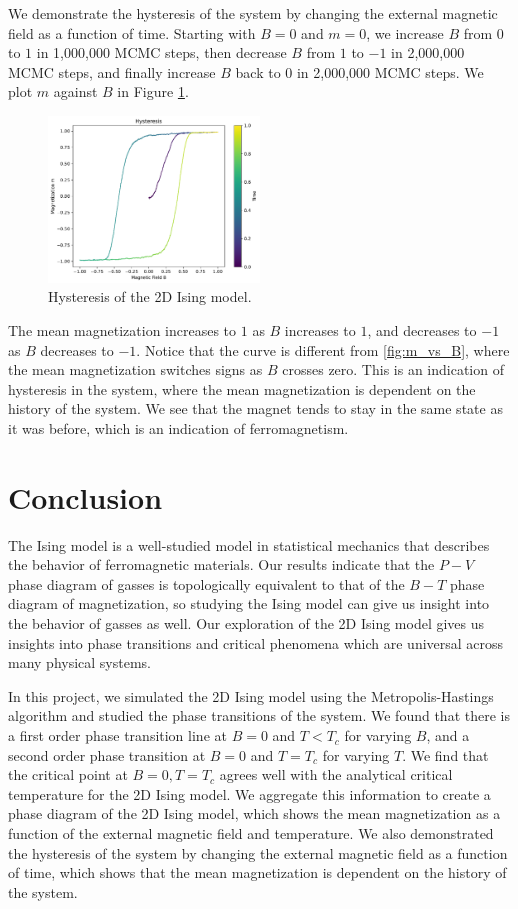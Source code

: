 \documentclass[
 reprint,
 amsmath,
 amssymb,
 aps,
]{revtex4-2}
\begin{document}
We demonstrate the hysteresis of the system by changing the external magnetic
field as a function of time.
Starting with $ B = 0 $ and $ m = 0 $,
we increase $ B $ from $ 0 $ to $ 1 $ in 1,000,000 MCMC steps,
then decrease $ B $ from $ 1 $ to $ -1 $ in 2,000,000 MCMC steps,
and finally increase $ B $ back to $ 0 $ in 2,000,000 MCMC steps.
We plot $ m $ against $ B $ in Figure \ref{fig:hysteresis}.
\begin{figure}[ht]
\centering
\includegraphics[width=0.5\textwidth]{figures/hysteresis.pdf}
\caption{Hysteresis of the 2D Ising model.}
\label{fig:hysteresis}
\end{figure}
The mean magnetization increases to $ 1 $ as $ B $ increases to $ 1 $,
and decreases to $ -1 $ as $ B $ decreases to $ -1 $.
Notice that the curve is different from \ref{fig:m_vs_B},
where the mean magnetization switches signs as $ B $ crosses zero.
This is an indication of hysteresis in the system,
where the mean magnetization is dependent on the history of the system.
We see that the magnet tends to stay in the same state as it was before,
which is an indication of ferromagnetism.



\section{Conclusion}
\label{sec:conclusion}
The Ising model is a well-studied model in statistical mechanics
that describes the behavior of ferromagnetic materials.
Our results indicate that the $ P-V $ phase diagram of gasses is topologically
equivalent to that of the $ B-T $ phase diagram of magnetization,
so studying the Ising model can give us insight into the behavior of gasses
as well.
Our exploration of the 2D Ising model gives us insights into phase
transitions and critical phenomena which are universal across many
physical systems.

In this project, we simulated the 2D Ising model using the Metropolis-Hastings
algorithm and studied the phase transitions of the system.
We found that there is a first order phase transition line at $ B=0 $
and $ T < T_{c} $ for varying $ B $, and a second order phase transition
at $ B=0 $ and $ T = T_{c} $ for varying $ T $.
We find that the critical point at $ B = 0, T = T_{c} $ agrees well with
the analytical critical temperature for the 2D Ising model.
We aggregate this information to create a phase diagram of the 2D Ising model,
which shows the mean magnetization as a function of the external magnetic
field and temperature.
We also demonstrated the hysteresis of the system by changing the external
magnetic field as a function of time,
which shows that the mean magnetization is dependent on the history of the
system.
\end{document}
